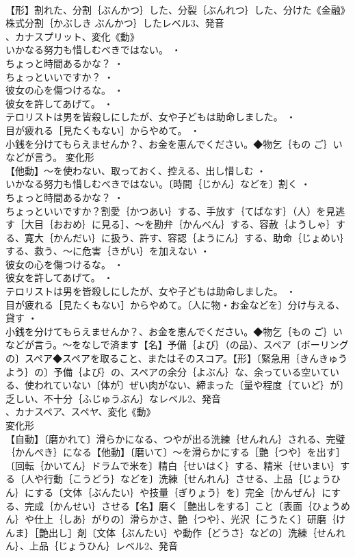\documentclass[8pt]{extreport}
\begin{document}
\begin{CJK}{UTF8}{min}
\\	【形】割れた、分割｛ぶんかつ｝した、分裂｛ぶんれつ｝した、分けた《金融》株式分割｛かぶしき ぶんかつ｝したレベル3、発音
\\	、カナスプリット、変化《動》
\\	いかなる努力も惜しむべきではない。 ・
\\	ちょっと時間あるかな？ ・
\\	ちょっといいですか？ ・
\\	彼女の心を傷つけるな。 ・
\\	彼女を許してあげて。 ・
\\	テロリストは男を皆殺しにしたが、女や子どもは助命しました。 ・
\\	目が疲れる［見たくもない］からやめて。 ・
\\	小銭を分けてもらえませんか？、お金を恵んでください。◆物乞｛もの ご｝いなどが言う。	変化形 
\\	【他動】～を使わない、取っておく、控える、出し惜しむ ・
\\	いかなる努力も惜しむべきではない。〔時間｛じかん｝などを〕割く ・
\\	ちょっと時間あるかな？ ・
\\	ちょっといいですか？割愛｛かつあい｝する、手放す｛てばなす｝（人）を見逃す［大目｛おおめ｝に見る］、～を勘弁｛かんべん｝する、容赦｛ようしゃ｝する、寛大｛かんだい｝に扱う、許す、容認｛ようにん｝する、助命｛じょめい｝する、救う、～に危害｛きがい｝を加えない ・
\\	彼女の心を傷つけるな。 ・
\\	彼女を許してあげて。 ・
\\	テロリストは男を皆殺しにしたが、女や子どもは助命しました。 ・
\\	目が疲れる［見たくもない］からやめて。〔人に物・お金などを〕分け与える、貸す ・
\\	小銭を分けてもらえませんか？、お金を恵んでください。◆物乞｛もの ご｝いなどが言う。～をなしで済ます【名】予備｛よび｝（の品）、スペア〔ボーリングの〕スペア◆スペアを取ること、またはそのスコア。【形】〔緊急用｛きんきゅうよう｝の〕予備｛よび｝の、スペアの余分｛よぶん｝な、余っている空いている、使われていない〔体が〕ぜい肉がない、締まった〔量や程度｛ていど｝が〕乏しい、不十分｛ふじゅうぶん｝なレベル2、発音
\\	、カナスペア、スペヤ、変化《動》
\\	変化形 
\\	【自動】〔磨かれて〕滑らかになる、つやが出る洗練｛せんれん｝される、完璧｛かんぺき｝になる【他動】〔磨いて〕～を滑らかにする［艶｛つや｝を出す］〔回転｛かいてん｝ドラムで米を〕精白｛せいはく｝する、精米｛せいまい｝する〔人や行動｛こうどう｝などを〕洗練｛せんれん｝させる、上品｛じょうひん｝にする〔文体｛ぶんたい｝や技量｛ぎりょう｝を〕完全｛かんぜん｝にする、完成｛かんせい｝させる【名】磨く［艶出しをする］こと〔表面｛ひょうめん｝や仕上｛しあ｝がりの〕滑らかさ、艶｛つや｝、光沢｛こうたく｝研磨｛けんま｝［艶出し］剤〔文体｛ぶんたい｝や動作｛どうさ｝などの〕洗練｛せんれん｝、上品｛じょうひん｝レベル2、発音

\end{CJK}
\end{document}
